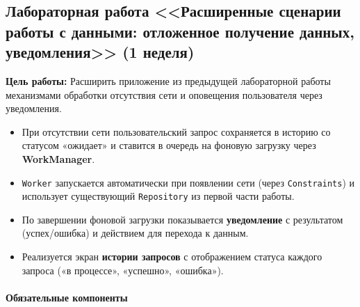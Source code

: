 \subsection{Лабораторная работа <<Расширенные сценарии работы с данными: отложенное получение данных, уведомления>> (1 неделя)}

\textbf{Цель работы:} Расширить приложение из предыдущей лабораторной работы механизмами обработки отсутствия сети и оповещения пользователя через уведомления.

\begin{itemize}
    \item При отсутствии сети пользовательский запрос сохраняется в историю со статусом «ожидает» и 
    ставится в очередь на фоновую загрузку через \textbf{WorkManager}.
    \item \texttt{Worker} запускается автоматически при появлении сети (через \texttt{Constraints}) 
    и использует существующий \texttt{Repository} из первой части работы.
    \item По завершении фоновой загрузки показывается \textbf{уведомление} с результатом (успех/ошибка) 
    и действием для перехода к данным.
    \item Реализуется экран \textbf{истории запросов} с отображением статуса каждого запроса 
    («в процессе», «успешно», «ошибка»).
\end{itemize}

\paragraph{Обязательные компоненты}

